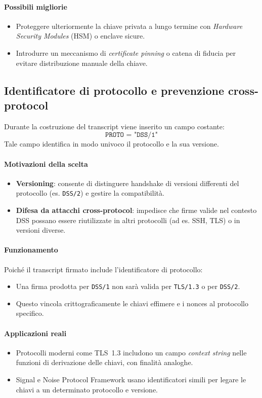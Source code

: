 \paragraph{Possibili migliorie}
\begin{itemize}
  \item Proteggere ulteriormente la chiave privata a lungo termine con \emph{Hardware Security Modules} (HSM) o enclave sicure.
  \item Introdurre un meccanismo di \emph{certificate pinning} o catena di fiducia per evitare distribuzione manuale della chiave.
\end{itemize}

\subsection{Identificatore di protocollo e prevenzione cross-protocol}
Durante la costruzione del transcript viene inserito un campo costante:
\[
  \texttt{PROTO = "DSS/1"}
\]
Tale campo identifica in modo univoco il protocollo e la sua versione.

\paragraph{Motivazioni della scelta}
\begin{itemize}
  \item \textbf{Versioning}: consente di distinguere handshake di versioni differenti del protocollo 
        (es. \texttt{DSS/2}) e gestire la compatibilità.
  \item \textbf{Difesa da attacchi cross-protocol}: impedisce che firme valide nel contesto DSS possano 
        essere riutilizzate in altri protocolli (ad es. SSH, TLS) o in versioni diverse.
\end{itemize}

\paragraph{Funzionamento}
Poiché il transcript firmato include l'identificatore di protocollo:
\begin{itemize}
  \item Una firma prodotta per \texttt{DSS/1} non sarà valida per \texttt{TLS/1.3} o per \texttt{DSS/2}.
  \item Questo vincola crittograficamente le chiavi effimere e i nonces al protocollo specifico.
\end{itemize}

\paragraph{Applicazioni reali}
\begin{itemize}
  \item Protocolli moderni come TLS~1.3 includono un campo \emph{context string} nelle funzioni di 
        derivazione delle chiavi, con finalità analoghe.
  \item Signal e Noise Protocol Framework usano identificatori simili per legare le chiavi a un determinato protocollo e versione.
\end{itemize}

